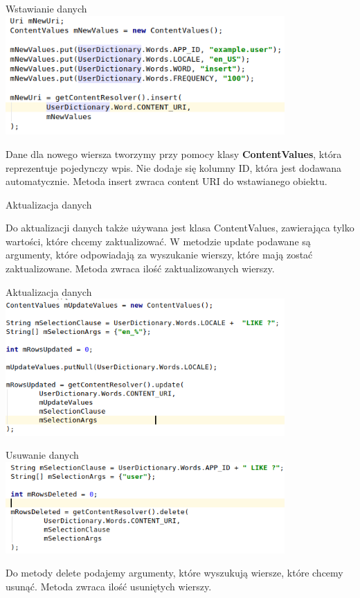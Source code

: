 \documentclass{beamer}
\begin{document}
\begin{frame}{Wstawianie danych}
	\centering
	\includegraphics[width=0.8\textwidth]{insert}
	\begin{block}{}
		Dane dla nowego wiersza tworzymy przy pomocy klasy \textbf{ContentValues}, która reprezentuje pojedynczy wpis. Nie dodaje się kolumny ID, która jest dodawana automatycznie. Metoda insert zwraca content URI do wstawianego obiektu.
	\end{block}
\end{frame}

\begin{frame}{Aktualizacja danych}
	\begin{block}{}
		Do aktualizacji danych także używana jest klasa ContentValues, zawierająca tylko wartości, które chcemy zaktualizować. W metodzie update podawane są argumenty, które odpowiadają za wyszukanie wierszy, które mają zostać zaktualizowane. Metoda zwraca ilość zaktualizowanych wierszy.
	\end{block}
\end{frame}

\begin{frame}{Aktualizacja danych}
	\centering
	\includegraphics[width=0.8\textwidth]{update}
\end{frame}

\begin{frame}{Usuwanie danych}
	\includegraphics[width=0.8\textwidth]{delete}
	\begin{block}{}
		Do metody delete podajemy argumenty, które wyszukują wiersze, które chcemy usunąć. Metoda zwraca ilość usuniętych wierszy.
	\end{block}
\end{frame}
\end{document}
